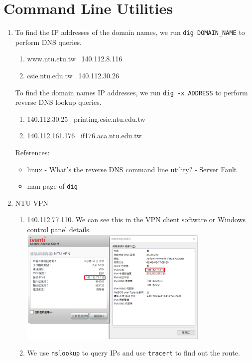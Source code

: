 \documentclass[12pt, a4paper]{article}
\begin{document}
  \section{Command Line Utilities}
  \begin{enumerate}
    \item To find the IP addresses of the domain names, we run
      \verb|dig DOMAIN_NAME| to perform DNS queries.
      \begin{enumerate}
        \item www.ntu.etu.tw \textrightarrow\ 140.112.8.116
        \item csie.ntu.edu.tw \textrightarrow\ 140.112.30.26
      \end{enumerate}
      To find the domain names IP addresses, we run
      \verb|dig -x ADDRESS| to perform reverse DNS lookup queries.
      \begin{enumerate}
        \item 140.112.30.25 \textrightarrow\ printing.csie.ntu.edu.tw
        \item 140.112.161.176 \textrightarrow\ if176.aca.ntu.edu.tw
      \end{enumerate}

      References:
      \begin{itemize}
        \item \href{https://serverfault.com/questions/7056/whats-the-reverse-dns-command-line-utility}{linux - What's the reverse DNS command line utility? - Server Fault}
        \item man page of \verb|dig|
      \end{itemize}

    \item NTU VPN
    \begin{enumerate}
      \item 140.112.77.110. We can see this in the VPN client software or
        Windows control panel details.\\
        \includegraphics[width=0.75\textwidth]{na_p4-2_ntu_vpn_ip.png}
      \item We use \verb|nslookup| to query IPs and use \verb|tracert| to find
        out the route.


\end{enumerate}
\end{enumerate}
\end{document}
